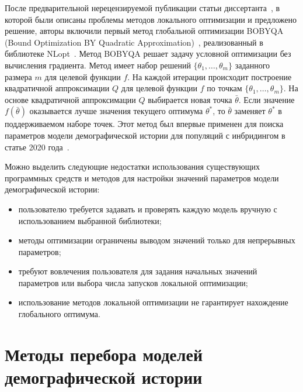После предварительной нерецензируемой публикации статьи диссертанта~\cite{noskova2020gadma}, в которой были описаны проблемы методов локального оптимизации и предложено решение, авторы \dadi включили первый метод глобальной оптимизации BOBYQA (Bound Optimization BY Quadratic Approximation)~\cite{powell2009bobyqa}, реализованный в библиотеке NLopt~\cite{johnson_nlopt}.
Метод BOBYQA решает задачу условной оптимизации без вычисления градиента.
Метод имеет набор решений $\{\theta_1, \dots, \theta_m\}$  заданного размера $m$ для целевой функции $f$.
На каждой итерации происходит построение квадратичной аппроксимации $Q$ для целевой функции $f$ по точкам $\{\theta_1, \dots, \theta_m\}$.
На основе квадратичной аппроксимации $Q$ выбирается новая точка $\bar{\theta}$.
Если значение $f(\bar{\theta})$ оказывается лучше значения текущего оптимума $\theta^*$, то $\bar{\theta}$ заменяет $\theta^*$ в поддерживаемом наборе точек.
Этот метод был впервые применен для поиска параметров модели демографической истории для популяций с инбридингом в статье 2020 года~\cite{blischak2020inferring}.

Можно выделить следующие недостатки использования существующих программных средств и методов для настройки значений параметров модели демографической истории:
\begin{itemize}
    \item пользователю требуется задавать и проверять каждую модель вручную с использованием выбранной библиотеки;
    \item методы оптимизации ограничены выводом значений только для непрерывных параметров;
    \item требуют вовлечения пользователя для задания начальных значений параметров или выбора числа запусков локальной оптимизации;
    \item использование методов локальной оптимизации не гарантирует нахождение глобального оптимума.
\end{itemize}

\section{Методы перебора моделей демографической истории}
\label{sec:part1:model_sel_methods}

